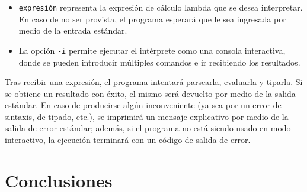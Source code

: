 \documentclass[11pt]{article}
\begin{document}
\begin{itemize}
\item \verb|expresión| representa la expresión de cálculo lambda que se
	desea interpretar. En caso de no ser provista, el programa esperará que le
    sea ingresada por medio de la entrada estándar.
\item La opción \verb|-i| permite ejecutar el intérprete como una consola
	interactiva, donde se pueden introducir múltiples comandos e ir recibiendo
    los resultados.
\end{itemize}

Tras recibir una expresión, el programa intentará parsearla, evaluarla y
tiparla. Si se obtiene un resultado con éxito, el mismo será devuelto por
medio de la salida estándar. En caso de producirse algún inconveniente
(ya sea por un error de sintaxis, de tipado, etc.), se imprimirá un mensaje
explicativo por medio de la salida de error estándar; además, si el programa
no está siendo usado en modo interactivo, la ejecución terminará con un código
de salida de error.


\section{Conclusiones}



\printbibliography

\end{document}
